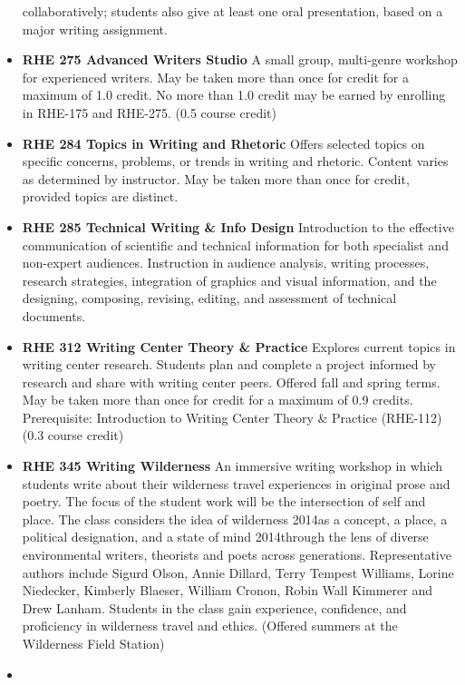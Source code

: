 \documentclass[
  letterpaper,
]{scrbook}
\begin{document}
\begin{itemize}
  collaboratively; students also give at least one oral presentation,
  based on a major writing assignment.\\
\item
  \textbf{RHE 275 Advanced Writers Studio} A small group, multi-genre
  workshop for experienced writers. May be taken more than once for
  credit for a maximum of 1.0 credit. No more than 1.0 credit may be
  earned by enrolling in RHE-175 and RHE-275. (0.5 course credit)
\item
  \textbf{RHE 284 Topics in Writing and Rhetoric} Offers selected topics
  on specific concerns, problems, or trends in writing and rhetoric.
  Content varies as determined by instructor. May be taken more than
  once for credit, provided topics are distinct.\\
\item
  \textbf{RHE 285 Technical Writing \& Info Design} Introduction to the
  effective communication of scientific and technical information for
  both specialist and non-expert audiences. Instruction in audience
  analysis, writing processes, research strategies, integration of
  graphics and visual information, and the designing, composing,
  revising, editing, and assessment of technical documents.
\item
  \textbf{RHE 312 Writing Center Theory \& Practice} Explores current
  topics in writing center research. Students plan and complete a
  project informed by research and share with writing center peers.
  Offered fall and spring terms. May be taken more than once for credit
  for a maximum of 0.9 credits. Prerequisite: Introduction to Writing
  Center Theory \& Practice (RHE-112) (0.3 course credit)\\
\item
  \textbf{RHE 345 Writing Wilderness} An immersive writing workshop in
  which students write about their wilderness travel experiences in
  original prose and poetry. The focus of the student work will be the
  intersection of self and place. The class considers the idea of
  wilderness 2014as a concept, a place, a political designation, and a
  state of mind 2014through the lens of diverse environmental writers,
  theorists and poets across generations. Representative authors include
  Sigurd Olson, Annie Dillard, Terry Tempest Williams, Lorine Niedecker,
  Kimberly Blaeser, William Cronon, Robin Wall Kimmerer and Drew Lanham.
  Students in the class gain experience, confidence, and proficiency in
  wilderness travel and ethics. (Offered summers at the Wilderness Field
  Station)
\item

\end{itemize}
\end{document}
